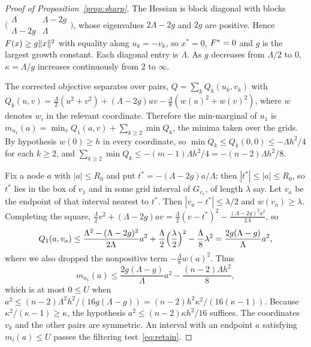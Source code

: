 \begin{proof}[Proof of Proposition~\ref{prop:sharp}]
The Hessian is block diagonal with blocks
$\bigl(\begin{smallmatrix}\Lambda&\Lambda-2g\\\Lambda-2g&\Lambda\end{smallmatrix}\bigr)$,
whose eigenvalues $2\Lambda-2g$ and $2g$ are positive. Hence
$F(x)\ge g\lVert x\rVert^2$ with equality along $u_k=-v_k$, so $x^*=0$, $F^{*}=0$ and
$g$ is the largest growth constant. Each diagonal entry is $\Lambda$. As $g$
decreases from $\Lambda/2$ to $0$, $\kappa=\Lambda/g$ increases continuously
from $2$ to $\infty$.

The corrected objective separates over pairs, $Q=\sum_kQ_k(u_k,v_k)$ with
$Q_k(u,v)=\frac\Lambda2(u^2+v^2)+(\Lambda-2g)uv-\frac\Lambda8(w(u)^2+w(v)^2)$,
where $w$ denotes $w_i$ in the relevant coordinate. Therefore the min-marginal
of $u_1$ is $m_{u_1}(a)=\min_vQ_1(a,v)+\sum_{k\ge2}\min Q_k$, the minima taken
over the grids. By hypothesis $w(0)\ge h$ in every coordinate, so
$\min Q_k\le Q_k(0,0)\le-\Lambda h^2/4$ for each $k\ge2$, and
$\sum_{k\ge2}\min Q_k\le-(m-1)\Lambda h^2/4=-(n-2)\Lambda h^2/8$.

Fix a node $a$ with $|a|\le R_0$ and put $t^*=-(\Lambda-2g)a/\Lambda$; then
$|t^*|\le|a|\le R_0$, so $t^*$ lies in the box of $v_1$ and in some grid
interval of $G_{v_1}$, of length $\lambda$ say. Let $v_a$ be the endpoint of
that interval nearest to $t^*$. Then $|v_a-t^*|\le\lambda/2$ and
$w(v_a)\ge\lambda$. Completing the square,
$\frac\Lambda2v^2+(\Lambda-2g)av=\frac\Lambda2(v-t^*)^2
-\frac{(\Lambda-2g)^2a^2}{2\Lambda}$, so
\[
Q_1(a,v_a)\le\frac{\Lambda^2-(\Lambda-2g)^2}{2\Lambda}a^2
+\frac\Lambda2\Bigl(\frac\lambda2\Bigr)^2-\frac\Lambda8\lambda^2
=\frac{2g(\Lambda-g)}{\Lambda}a^2 ,
\]
where we also dropped the nonpositive term $-\frac\Lambda8w(a)^2$. Thus
\[
m_{u_1}(a)\le\frac{2g(\Lambda-g)}{\Lambda}a^2-\frac{(n-2)\Lambda h^2}8,
\]
which is at most $0\le U$ when
$a^2\le(n-2)\Lambda^2h^2/(16g(\Lambda-g))=(n-2)h^2\kappa^2/(16(\kappa-1))$.
Because $\kappa^2/(\kappa-1)\ge\kappa$, the hypothesis
$a^2\le(n-2)\kappa h^2/16$ suffices. The coordinates $v_k$ and the other
pairs are symmetric. An interval with an endpoint $a$ satisfying
$m_i(a)\le U$ passes the filtering test~\eqref{eq:retain}.
\end{proof}

